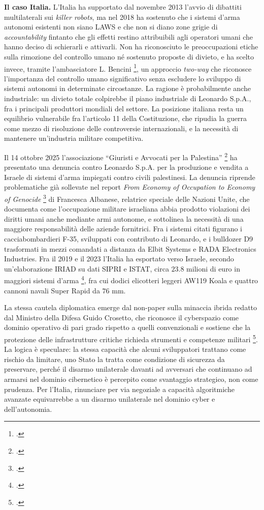 \ifstampa\documentclass[a4paper,12pt,twoside,openright]{report}\else\documentclass[a4paper,12pt]{report}\fi
\newif\ifrevisione \revisionefalse
\DeclareRobustCommand{\rev}[1]{\ifrevisione{\color{blue!65!black}#1}\else#1\fi}
\begin{document}
\textbf{Il caso Italia.}
L'Italia ha supportato dal novembre 2013 l'avvio di dibattiti multilaterali sui
\textit{killer robots}, ma nel 2018 ha sostenuto che i sistemi d'arma autonomi
esistenti non siano LAWS e che non si diano zone grigie di
\textit{accountability} fintanto che gli effetti restino attribuibili agli
operatori umani che hanno deciso di schierarli e attivarli. Non ha riconosciuto
le preoccupazioni etiche sulla rimozione del controllo umano né sostenuto
proposte di divieto, e ha scelto invece, tramite l'ambasciatore L. Bencini
\footcite[p.~29]{wareham_2020}, un approccio \textit{two-way} che riconosce l'importanza
del controllo umano significativo senza escludere lo sviluppo di sistemi
autonomi in determinate circostanze. La ragione è probabilmente anche industriale: un divieto
totale colpirebbe il piano industriale di Leonardo S.p.A., fra i principali
produttori mondiali del settore. La posizione italiana resta un equilibrio
vulnerabile fra l'articolo 11 della Costituzione, che ripudia la guerra come
mezzo di risoluzione delle controversie internazionali, e la necessità di
mantenere un'industria militare competitiva.
 
Il 14 ottobre 2025 l'associazione ``Giuristi e Avvocati per la Palestina''
\footcite{denunciacpi} ha presentato una denuncia contro Leonardo S.p.A. per la
produzione e vendita a Israele di sistemi d'arma impiegati contro civili
palestinesi. La denuncia riprende problematiche già sollevate nel report
\textit{From Economy of Occupation to Economy of Genocide}
\footcite{albanese_report} di Francesca Albanese, relatrice speciale delle
Nazioni Unite, che documenta come l'occupazione militare israeliana abbia
prodotto violazioni dei diritti umani anche mediante armi autonome, e sottolinea
la necessità di una maggiore responsabilità delle aziende fornitrici. Fra i
sistemi citati figurano i cacciabombardieri F-35, sviluppati con contributo di
Leonardo, e i bulldozer D9 trasformati in mezzi \rev{comandati a
distanza} da Elbit Systems e RADA Electronics Industries. Fra il 2019 e il 2023
l'Italia ha esportato verso Israele, secondo \rev{un'elaborazione IRIAD su dati SIPRI e ISTAT}, circa $23.8$ milioni
di euro in maggiori sistemi d'arma \footcite{iriad_2025_export_israele}, fra cui dodici elicotteri leggeri AW119 Koala e quattro cannoni navali Super Rapid da
$76$ mm.
 
La stessa cautela diplomatica emerge dal non-paper sulla minaccia ibrida redatto
dal Ministro della Difesa Guido Crosetto, che riconosce il cyberspazio come
dominio operativo di pari grado rispetto a quelli convenzionali e sostiene che
la protezione delle infrastrutture critiche richieda strumenti e competenze
militari \footcite{crosetto_2025_nonpaper}. La logica è speculare: la stessa capacità che alcuni sviluppatori trattano come rischio
da limitare, uno Stato la tratta come condizione di sicurezza da preservare,
perché il disarmo unilaterale davanti ad avversari che continuano ad armarsi
\rev{nel dominio cibernetico} è percepito come svantaggio strategico, non come prudenza. Per l'Italia, rinunciare
per via negoziale a capacità algoritmiche avanzate equivarrebbe a un disarmo
unilaterale nel dominio cyber e dell'autonomia.
 
\end{document}
